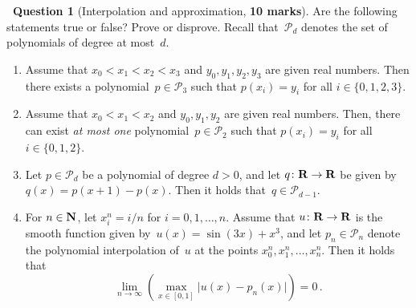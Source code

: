 \documentclass[10pt]{article}
\theoremstyle{definition}
\newtheorem{question}{{\normalfont \faGears}~Question}
\theoremstyle{remark}
\renewcommand{\mymarks}[1]{\textbf{#1 marks}}
\begin{document}
\begin{question}
    [Interpolation and approximation, \mymarks{10}]
    Are the following statements true or false? Prove or disprove.
    Recall that~$\mathcal P_d$ denotes the set of polynomials of degree at most~$d$.

    \begin{enumerate}
        \item
            Assume that $x_0 < x_1 < x_2 < x_3$ and $y_0, y_1, y_2, y_3$ are given real numbers.
            Then there exists a polynomial~$p \in \mathcal P_3$ such that
            \(
                p(x_i) = y_i
            \)
            for all $i \in \{0, 1, 2, 3\}$.

        \item
            Assume that $x_0 < x_1 < x_2$ and $y_0, y_1, y_2$ are given real numbers.
            Then, there can exist \emph{at most one} polynomial~$p \in \mathcal P_2$ such that
            \(
                p(x_i) = y_i
            \)
            for all $i \in \{0, 1, 2\}$.

        \item
            Let $p \in \mathcal P_d$ be a polynomial of degree $d > 0$,
            and let $q\colon \mathbf R \to \mathbf R$ be given by $q(x) = p(x+1) - p(x)$.
            Then it holds that~$q \in \mathcal P_{d-1}$.

        \item
            For $n \in \mathbf N$, let $x^n_i = i/n$ for $i = 0, 1, \dotsc, n$.
            Assume that $u \colon \mathbf R \to \mathbf R$ is the smooth function given by~$u(x) = \sin(3x) + x^3$,
            and let $p_n \in \mathcal P_n$ denote the polynomial interpolation of~$u$ at the points $x^n_0, x^n_1, \dotsc, x^n_n$.
            Then it holds that
            \[
                \lim_{n \to \infty} \left( \max_{x \in [0, 1]} \bigl\lvert u(x) - p_n(x) \bigr\rvert \right) = 0 \, .
            \]
    \end{enumerate}
\end{question}
\end{document}
